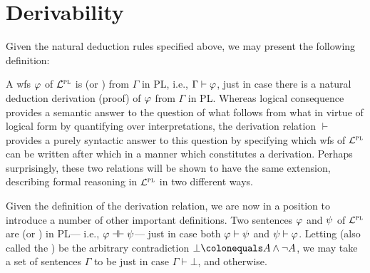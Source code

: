 \section{Derivability}
  \label{sec:Derivability}

Given the natural deduction rules specified above, we may present the following definition:


A wfs $\varphi$ of $\mathcal{L}^{\textsc{pl}}$ is  (or ) from $\Gamma$ in PL, i.e., $\Gamma \vdash \varphi$, just in case there is a natural deduction derivation (proof) of $\varphi$ from $\Gamma$ in PL. 
Whereas logical consequence provides a semantic answer to the question of what follows from what in virtue of logical form by quantifying over interpretations, the derivation relation $\vdash$ provides a purely syntactic answer to this question by specifying which wfs of $\mathcal{L}^{\textsc{pl}}$ can be written after which in a manner which constitutes a derivation.
Perhaps surprisingly, these two relations will be shown to have the same extension, describing formal reasoning in $\mathcal{L}^{\textsc{pl}}$ in two different ways.

Given the definition of the derivation relation, we are now in a position to introduce a number of other important definitions.
Two sentences $\varphi$ and $\psi$ of $\mathcal{L}^{\textsc{pl}}$ are  (or ) in PL--- i.e., $\varphi \dashv\vdash \psi$--- just in case both $\varphi\vdash\psi$ and $\psi\vdash\varphi$.
Letting  (also called the ) be the arbitrary contradiction $\bot \colonequals A \wedge \enot A$, we may take a set of sentences $\Gamma$ to be  just in case $\Gamma \vdash \bot$, and  otherwise.

